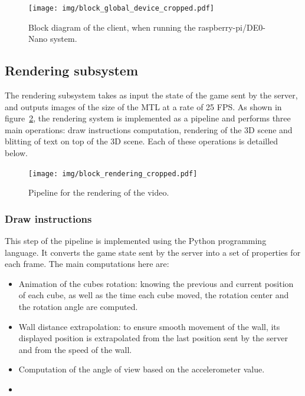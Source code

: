 \documentclass[english, DIV=13]{scrartcl}
\begin{document}
\begin{figure}
    \centering
    \texttt{[image: img/block\_global\_device\_cropped.pdf]}
    \caption{Block diagram of the client, when running the raspberry-pi/DE0-Nano system.}
    \label{fig:global-device}
\end{figure}

\subsection{Rendering subsystem}
\label{sec:rendering}

The rendering subsystem takes as input the state of the game sent by the server,
and outputs images of the size of the MTL at a rate
of 25 FPS. As shown in figure~\ref{fig:rendering}, the rendering system is
implemented as a pipeline and performs three main operations: draw instructions
computation, rendering of the 3D scene and blitting of text on top of the 3D scene.
Each of these operations is detailled below.

\begin{figure}
    \centering
    \texttt{[image: img/block\_rendering\_cropped.pdf]}
    \caption{Pipeline for the rendering of the video.}
    \label{fig:rendering}
\end{figure}

\subsubsection{Draw instructions}

This step of the pipeline is implemented using the Python programming language.
It converts the game state sent by the server into a set of properties for each
frame. The main computations here are:
\begin{itemize}
    \item Animation of the cubes rotation: knowing the previous and current
        position of each cube, as well as the time each cube moved, the rotation
        center and the rotation angle are computed.
    \item Wall distance extrapolation: to ensure smooth movement of the wall, its
        displayed position is extrapolated from the last position sent by the server
        and from the speed of the wall.
    \item Computation of the angle of view based on the accelerometer value.
    \item {}
\end{itemize}
\end{document}
